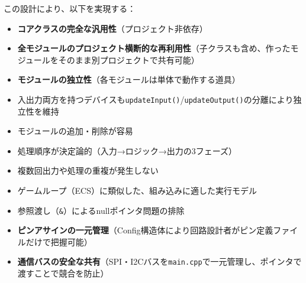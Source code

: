 この設計により、以下を実現する：
\begin{itemize}
    \item \textbf{コアクラスの完全な汎用性}（プロジェクト非依存）
    \item \textbf{全モジュールのプロジェクト横断的な再利用性}（子クラスも含め、作ったモジュールをそのまま別プロジェクトで共有可能）
    \item \textbf{モジュールの独立性}（各モジュールは単体で動作する道具）
    \item 入出力両方を持つデバイスも\texttt{updateInput()}/\texttt{updateOutput()}の分離により独立性を維持
    \item モジュールの追加・削除が容易
    \item 処理順序が決定論的（入力→ロジック→出力の3フェーズ）
    \item 複数回出力や処理の重複が発生しない
    \item ゲームループ（ECS）に類似した、組み込みに適した実行モデル
    \item 参照渡し（\texttt{\&}）によるnullポインタ問題の排除
    \item \textbf{ピンアサインの一元管理}（Config構造体により回路設計者がピン定義ファイルだけで把握可能）
    \item \textbf{通信バスの安全な共有}（SPI・I2Cバスを\texttt{main.cpp}で一元管理し、ポインタで渡すことで競合を防止）
\end{itemize}


